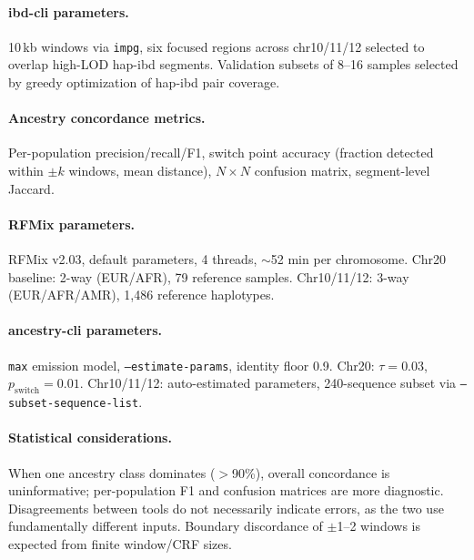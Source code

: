 \documentclass[11pt]{article}
\begin{document}
\paragraph{ibd-cli parameters.}
10\,kb windows via \texttt{impg}, six focused regions across chr10/11/12 selected to overlap high-LOD hap-ibd segments. Validation subsets of 8--16 samples selected by greedy optimization of hap-ibd pair coverage.

\paragraph{Ancestry concordance metrics.}
Per-population precision/recall/F1, switch point accuracy (fraction detected within $\pm k$ windows, mean distance), $N \times N$ confusion matrix, segment-level Jaccard.

\paragraph{RFMix parameters.}
RFMix v2.03, default parameters, 4 threads, $\sim$52 min per chromosome. Chr20 baseline: 2-way (EUR/AFR), 79 reference samples. Chr10/11/12: 3-way (EUR/AFR/AMR), 1,486 reference haplotypes.

\paragraph{ancestry-cli parameters.}
\texttt{max} emission model, \texttt{--estimate-params}, identity floor 0.9. Chr20: $\tau = 0.03$, $p_{\text{switch}} = 0.01$. Chr10/11/12: auto-estimated parameters, 240-sequence subset via \texttt{--subset-sequence-list}.

\paragraph{Statistical considerations.}
When one ancestry class dominates ($>$90\%), overall concordance is uninformative; per-population F1 and confusion matrices are more diagnostic. Disagreements between tools do not necessarily indicate errors, as the two use fundamentally different inputs. Boundary discordance of $\pm$1--2 windows is expected from finite window/CRF sizes.



\end{document}
